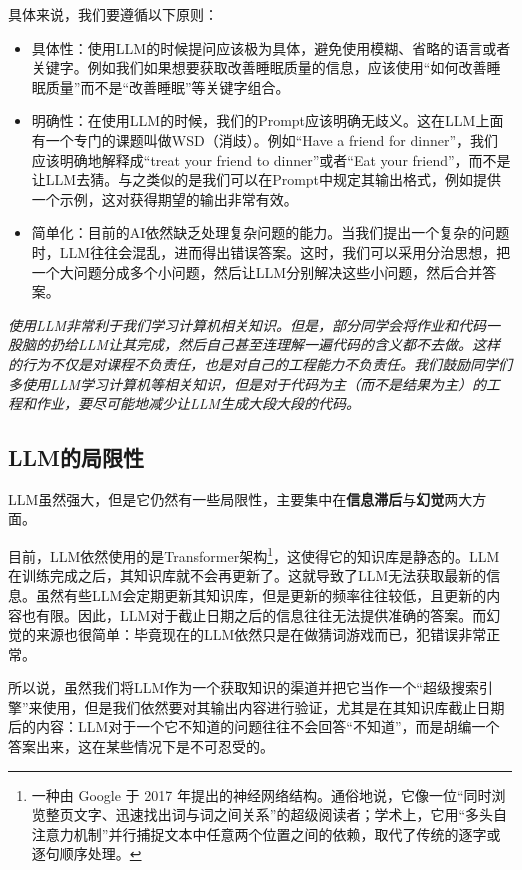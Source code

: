 \documentclass[../main.tex]{subfiles}
\begin{document}
具体来说，我们要遵循以下原则：

\begin{itemize}
  \item 具体性：使用LLM的时候提问应该极为具体，避免使用模糊、省略的语言或者关键字。例如我们如果想要获取改善睡眠质量的信息，应该使用“如何改善睡眠质量”而不是“改善睡眠”等关键字组合。
  \item 明确性：在使用LLM的时候，我们的Prompt应该明确无歧义。这在LLM上面有一个专门的课题叫做WSD（消歧）。例如“Have a friend for dinner”，我们应该明确地解释成“treat your friend to dinner”或者“Eat your friend”，而不是让LLM去猜。与之类似的是我们可以在Prompt中规定其输出格式，例如提供一个示例，这对获得期望的输出非常有效。
  \item 简单化：目前的AI依然缺乏处理复杂问题的能力。当我们提出一个复杂的问题时，LLM往往会混乱，进而得出错误答案。这时，我们可以采用分治思想，把一个大问题分成多个小问题，然后让LLM分别解决这些小问题，然后合并答案。
\end{itemize}

\emph{使用LLM非常利于我们学习计算机相关知识。但是，部分同学会将作业和代码一股脑的扔给LLM让其完成，然后自己甚至连理解一遍代码的含义都不去做。这样的行为不仅是对课程不负责任，也是对自己的工程能力不负责任。我们鼓励同学们多使用LLM学习计算机等相关知识，但是对于代码为主（而不是结果为主）的工程和作业，要尽可能地减少让LLM生成大段大段的代码。}

\subsection{LLM的局限性}

LLM虽然强大，但是它仍然有一些局限性，主要集中在\textbf{信息滞后}与\textbf{幻觉}两大方面。

目前，LLM依然使用的是Transformer架构\footnote{一种由 Google 于 2017 年提出的神经网络结构。通俗地说，它像一位“同时浏览整页文字、迅速找出词与词之间关系”的超级阅读者；学术上，它用“多头自注意力机制”并行捕捉文本中任意两个位置之间的依赖，取代了传统的逐字或逐句顺序处理。}，这使得它的知识库是静态的。LLM在训练完成之后，其知识库就不会再更新了。这就导致了LLM无法获取最新的信息。虽然有些LLM会定期更新其知识库，但是更新的频率往往较低，且更新的内容也有限。因此，LLM对于截止日期之后的信息往往无法提供准确的答案。而幻觉的来源也很简单：毕竟现在的LLM依然只是在做猜词游戏而已，犯错误非常正常。

所以说，虽然我们将LLM作为一个获取知识的渠道并把它当作一个“超级搜索引擎”来使用，但是我们依然要对其输出内容进行验证，尤其是在其知识库截止日期后的内容：LLM对于一个它不知道的问题往往不会回答“不知道”，而是胡编一个答案出来，这在某些情况下是不可忍受的。
\end{document}
